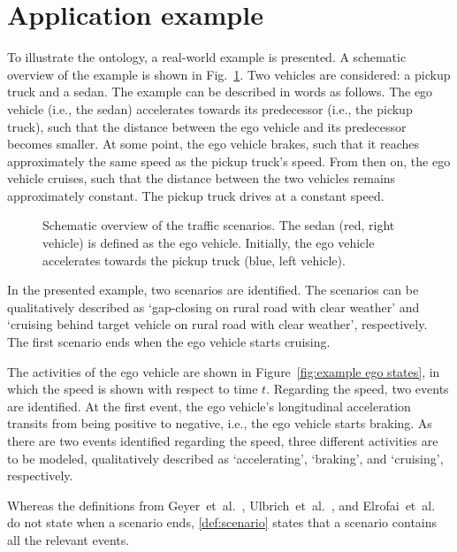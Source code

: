 \section{Application example}
\label{sec:example}

To illustrate the ontology, a real-world example is presented. A schematic overview of the example is shown in Fig.~\ref{fig:example schematic}. Two vehicles are considered: a pickup truck and a sedan. The example can be described in words as follows. The ego vehicle (i.e., the sedan) accelerates towards its predecessor (i.e., the pickup truck), such that the distance between the ego vehicle and its predecessor becomes smaller. At some point, the ego vehicle brakes, such that it reaches approximately the same speed as the pickup truck's speed. From then on, the ego vehicle cruises, such that the distance between the two vehicles remains approximately constant. The pickup truck drives at a constant speed.

\begin{figure}
	\centering
	\setlength\figureheight{121pt}
	\setlength\figurewidth{260pt}
	\caption{Schematic overview of the traffic scenarios. The sedan (red, right vehicle) is defined as the ego vehicle. Initially, the ego vehicle accelerates towards the pickup truck (blue, left vehicle).}
	\label{fig:example schematic}
	\spaceaftercaption
\end{figure}

In the presented example, two scenarios are identified. The scenarios can be qualitatively described as `gap-closing on rural road with clear weather' and `cruising behind target vehicle on rural road with clear weather', respectively. The first scenario ends when the ego vehicle starts cruising. 

The activities of the ego vehicle are shown in Figure~\ref{fig:example ego states}, in which the speed is shown with respect to time $t$. Regarding the speed, two events are identified. At the first event, the ego vehicle's longitudinal acceleration transits from being positive to negative, i.e., the ego vehicle starts braking. As there are two events identified regarding the speed, three different activities are to be modeled, qualitatively described as `accelerating', `braking', and `cruising', respectively. 

\cbstart
Whereas the definitions from Geyer~et~al.~\cite{geyer2014}, Ulbrich~et~al.~\cite{ulbrich2015}, and Elrofai~et~al.~\cite{elrofai2016scenario} do not state when a scenario ends, \cref{def:scenario} states that a scenario contains all the relevant events.
\cbend

